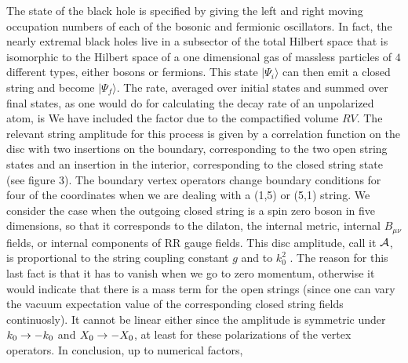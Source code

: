 The state of the black hole  is specified by giving the
left and right moving occupation numbers of each of the
 bosonic and fermionic oscillators.
In fact, the nearly extremal black holes live in
a subsector of the total Hilbert space that is
isomorphic to  the Hilbert space of a one dimensional
gas of massless particles of $ 4 $ different types,
either  bosons or  fermions.
This state $|\Psi_i\rangle$ can then emit  a
closed string and become $|\Psi_f\rangle$.
The rate, averaged over initial states and summed over final states,
as one would do for calculating the decay rate of an unpolarized
atom, is
\eqn{}
We have included the factor due to 
the compactified volume  $R V$.  
The relevant string amplitude for this process is given
by a correlation function on the disc with two insertions
on the boundary, corresponding to the two open string
states and an insertion in the interior, corresponding to
the closed string state (see figure 3).
 The boundary vertex operators
change boundary conditions for four of the coordinates when 
we are dealing with a (1,5) or (5,1) string.
We consider the case when the outgoing closed string is
a spin zero  boson in five dimensions,
so that it corresponds to the dilaton,  the
internal metric,  internal $B_{\mu\nu}$ fields,
or internal components of RR gauge fields.
This disc  amplitude, call it  $\cal A $,  is proportional to the
string coupling constant $g$
and to $k_0^2$ \hk . The reason for this
last fact is that it has to vanish when we go to zero
momentum, otherwise it would indicate that there is
a mass term for the open strings (since one can vary the vacuum
expectation value of the corresponding closed string fields
continuosly). It cannot be linear either  since
the
amplitude is symmetric   under
$ k_0 \rightarrow -k_0$ and $X_0 \rightarrow - X_0 $, at least  for these polarizations of
the vertex operators. 
In conclusion, up to numerical factors,
\eqn{}

